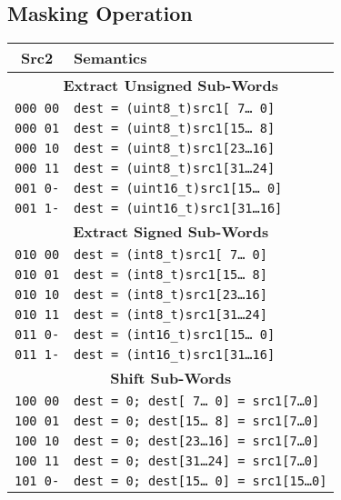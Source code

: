 \documentclass[10pt,a4paper]{article}
\begin{document}
\pagebreak
\subsection{Masking Operation}
\label{sec:mask}

\begin{tabular}{cl}
\toprule
Src2 & Semantics \\
\midrule
\multicolumn{2}{c}{\textbf{Extract Unsigned Sub-Words}} \\
\cmidrule{1-2}
\texttt{000 00} & \texttt{dest = (uint8\_t)src1[ 7\ldots{}\ 0]} \\
\texttt{000 01} & \texttt{dest = (uint8\_t)src1[15\ldots{}\ 8]} \\
\texttt{000 10} & \texttt{dest = (uint8\_t)src1[23\ldots{}16]} \\
\texttt{000 11} & \texttt{dest = (uint8\_t)src1[31\ldots{}24]} \\
\cmidrule{1-2}
\texttt{001 0-} & \texttt{dest = (uint16\_t)src1[15\ldots{}\ 0]} \\
\texttt{001 1-} & \texttt{dest = (uint16\_t)src1[31\ldots{}16]} \\
\midrule
\multicolumn{2}{c}{\textbf{Extract Signed Sub-Words}} \\
\cmidrule{1-2}
\texttt{010 00} & \texttt{dest = (int8\_t)src1[ 7\ldots{}\ 0]} \\
\texttt{010 01} & \texttt{dest = (int8\_t)src1[15\ldots{}\ 8]} \\
\texttt{010 10} & \texttt{dest = (int8\_t)src1[23\ldots{}16]} \\
\texttt{010 11} & \texttt{dest = (int8\_t)src1[31\ldots{}24]} \\
\cmidrule{1-2}
\texttt{011 0-} & \texttt{dest = (int16\_t)src1[15\ldots{}\ 0]} \\
\texttt{011 1-} & \texttt{dest = (int16\_t)src1[31\ldots{}16]} \\
\midrule
\multicolumn{2}{c}{\textbf{Shift Sub-Words}} \\
\cmidrule{1-2}
\texttt{100 00} & \texttt{dest = 0; dest[ 7\ldots{}\ 0] = src1[7\ldots{}0]} \\
\texttt{100 01} & \texttt{dest = 0; dest[15\ldots{}\ 8] = src1[7\ldots{}0]} \\
\texttt{100 10} & \texttt{dest = 0; dest[23\ldots{}16] = src1[7\ldots{}0]} \\
\texttt{100 11} & \texttt{dest = 0; dest[31\ldots{}24] = src1[7\ldots{}0]} \\
\cmidrule{1-2}
\texttt{101 0-} & \texttt{dest = 0; dest[15\ldots{}\ 0] = src1[15\ldots{}0]} \\

\end{tabular}
\end{document}
